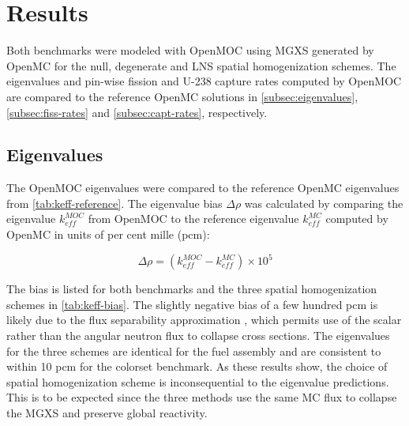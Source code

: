 \section{Results}
\label{sec:results}

Both benchmarks were modeled with OpenMOC using MGXS generated by OpenMC for the null, degenerate and LNS spatial homogenization schemes. The eigenvalues and pin-wise fission and U-238 capture rates computed by OpenMOC are compared to the reference OpenMC solutions in \autoref{subsec:eigenvalues}, \autoref{subsec:fiss-rates} and \autoref{subsec:capt-rates}, respectively.


\subsection{Eigenvalues}
\label{subsec:eigenvalues}

The OpenMOC eigenvalues were compared to the reference OpenMC eigenvalues from \autoref{tab:keff-reference}. The eigenvalue bias $\Delta\rho$ was calculated by comparing the eigenvalue $k_{eff}^{MOC}$ from OpenMOC to the reference eigenvalue $k_{eff}^{MC}$ computed by OpenMC in units of per cent mille (pcm):

\begin{equation}
\label{eqn:delta-rho}
\Delta\rho = \left(k_{eff}^{MOC} - k_{eff}^{MC}\right) \times 10^{5}
\end{equation}

The bias is listed for both benchmarks and the three spatial homogenization schemes in \autoref{tab:keff-bias}. The slightly negative bias of a few hundred pcm is likely due to the flux separability approximation \citep{boyd2018sph}, which permits use of the scalar rather than the angular neutron flux to collapse cross sections. The eigenvalues for the three schemes are identical for the fuel assembly and are consistent to within 10 pcm for the colorset benchmark. As these results show, the choice of spatial homogenization scheme is inconsequential to the eigenvalue predictions. This is to be expected since the three methods use the same MC flux to collapse the MGXS and preserve global reactivity.


